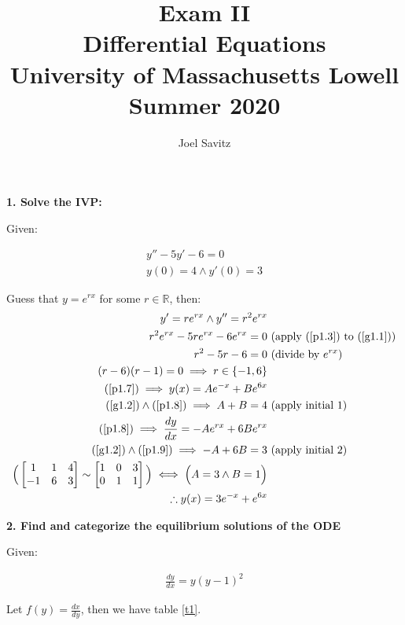 \documentclass[12pt]{article}
\title{Exam II \\
\small Differential Equations \\
University of Massachusetts Lowell \\
Summer 2020}
\author{Joel Savitz}
\newcommand{\reals}{\mathbb{R}}
\begin{document}
\maketitle

\textbf{1. Solve the IVP:}

Given:

\begin{align}
	\label{g1.1}
	y'' - 5y' -6 = 0 \\
	\label{g1.2}
	y(0) = 4 \land y'(0) = 3
\end{align}

Guess that $y = e^{rx}$ for some $r \in \reals$, then:
\begin{align}
	\label{p1.3}
	y' = re^{rx} \land y'' = r^2e^{rx} & \\
	r^2e^{rx}-5re^{rx}-6e^{rx} = 0 & \textrm{ (apply (\ref{p1.3}) to (\ref{g1.1})}) \\
	r^2-5r-6 = 0 & \textrm{ (divide by $e^{rx}$)} \\
	\label{p1.7}
	(r-6)(r-1) = 0 \implies r \in \{ -1, 6 \} & \\
	\label{p1.8}
	(\ref{p1.7}) \implies y(x) = Ae^{-x} + Be^{6x} \\
	(\ref{g1.2}) \land (\ref{p1.8}) \implies A + B = 4 & \textrm{ (apply initial 1)}\\
	\label{p1.9}
	(\ref{p1.8}) \implies \frac{dy}{dx} = -Ae^{rx} + 6Be^{rx} \\
	(\ref{g1.2}) \land (\ref{p1.9}) \implies -A + 6B = 3 & \textrm{ (apply initial 2)}\\
	\Big(\begin{bmatrix} 1 & 1 & 4 \\ -1 & 6 & 3 \end{bmatrix} \sim
	\begin{bmatrix} 1 & 0 & 3 \\ 0 & 1 & 1 \end{bmatrix} \Big)
	\iff \Big(A = 3 \land B = 1 \Big) \\
	\label{s1}
	\therefore y(x) = 3e^{-x} + e^{6x}
\end{align}

\medskip

\textbf{2. Find and categorize the equilibrium solutions of the ODE}

Given:

\begin{align}
	\label{g2}
	\frac{dy}{dx} = y(y - 1)^2
\end{align}

Let $f(y) = \frac{dx}{dy}$, then we have table \ref{t1}.
\end{document}
